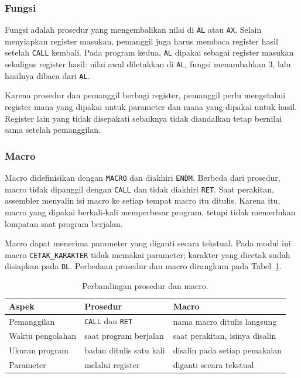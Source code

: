 \subsubsection*{Fungsi}

Fungsi adalah prosedur yang mengembalikan nilai di \texttt{AL} atau
\texttt{AX}. Selain menyiapkan register masukan, pemanggil juga harus
membaca register hasil setelah \texttt{CALL} kembali. Pada program
kedua, \texttt{AL} dipakai sebagai register masukan sekaligus
register hasil: nilai awal diletakkan di \texttt{AL}, fungsi
menambahkan 3, lalu hasilnya dibaca dari \texttt{AL}.

Karena prosedur dan pemanggil berbagi register, pemanggil perlu
mengetahui register mana yang dipakai untuk parameter dan mana yang
dipakai untuk hasil. Register lain yang tidak disepakati sebaiknya
tidak diandalkan tetap bernilai sama setelah pemanggilan.

\subsubsection*{Macro}

Macro didefinisikan dengan \texttt{MACRO} dan diakhiri \texttt{ENDM}.
Berbeda dari prosedur, macro tidak dipanggil dengan \texttt{CALL} dan
tidak diakhiri \texttt{RET}. Saat perakitan, assembler menyalin isi
macro ke setiap tempat macro itu ditulis. Karena itu, macro yang
dipakai berkali-kali memperbesar program, tetapi tidak memerlukan
lompatan saat program berjalan.

Macro dapat menerima parameter yang diganti secara tekstual. Pada
modul ini macro \texttt{CETAK\_KARAKTER} tidak memakai parameter;
karakter yang dicetak sudah disiapkan pada \texttt{DL}. Perbedaan
prosedur dan macro dirangkum pada Tabel~\ref{tab:m06-banding}.

\begin{table}[H]
    \centering
    \caption{Perbandingan prosedur dan macro.}
    \label{tab:m06-banding}
    \small
    \begin{tabular}{@{}lll@{}}
        \toprule
        \textbf{Aspek} & \textbf{Prosedur} & \textbf{Macro} \\
        \midrule
        Pemanggilan & \texttt{CALL} dan \texttt{RET} &
        nama macro ditulis langsung \\
        Waktu pengolahan & saat program berjalan &
        saat perakitan, isinya disalin \\
        Ukuran program & badan ditulis satu kali &
        disalin pada setiap pemakaian \\
        Parameter & melalui register &
        diganti secara tekstual \\
        \bottomrule
    \end{tabular}
\end{table}

